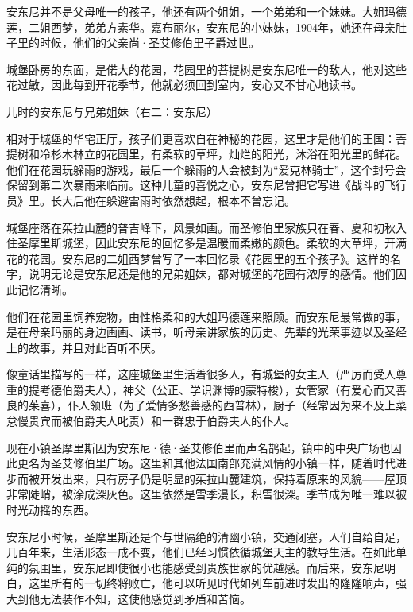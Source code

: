 安东尼并不是父母唯一的孩子，他还有两个姐姐，一个弟弟和一个妹妹。大姐玛德莲，二姐西梦，弟弟方素华。嘉布丽尔，安东尼的小妹妹，1904年，她还在母亲肚子里的时候，他们的父亲尚·圣艾修伯里子爵过世。

城堡卧房的东面，是偌大的花园，花园里的菩提树是安东尼唯一的敌人，他对这些花过敏，因此每到开花季节，他就必须回到室内，安心又不甘心地读书。

{\startalignment[center]
 \stopalignment}
儿时的安东尼与兄弟姐妹（右二：安东尼）

相对于城堡的华宅正厅，孩子们更喜欢自在神秘的花园，这里才是他们的王国：菩提树和冷杉木林立的花园里，有柔软的草坪，灿烂的阳光，沐浴在阳光里的鲜花。他们在花园玩躲雨的游戏，最后一个躲雨的人会被封为“爱克林骑士”，这个封号会保留到第二次暴雨来临前。这种儿童的喜悦之心，安东尼曾把它写进《战斗的飞行员》里。长大后他在躲避雷雨时依然想起，根本不曾忘记。

城堡座落在茱拉山麓的普吉峰下，风景如画。而圣修伯里家族只在春、夏和初秋入住圣摩里斯城堡，因此安东尼的回忆多是温暖而柔嫩的颜色。柔软的大草坪，开满花的花园。安东尼的二姐西梦曾写了一本回忆录《花园里的五个孩子》。这样的名字，说明无论是安东尼还是他的兄弟姐妹，都对城堡的花园有浓厚的感情。他们因此记忆清晰。

他们在花园里饲养宠物，由性格柔和的大姐玛德莲来照顾。而安东尼最常做的事，是在母亲玛丽的身边画画、读书，听母亲讲家族的历史、先辈的光荣事迹以及圣经上的故事，并且对此百听不厌。

像童话里描写的一样，这座城堡里生活着很多人，有城堡的女主人（严厉而受人尊重的提考德伯爵夫人），神父（公正、学识渊博的蒙特梭），女管家（有爱心而又善良的茱喜），仆人领班（为了爱情多愁善感的西普林），厨子（经常因为来不及上菜怠慢贵宾而被伯爵夫人叱责）和一群忠于伯爵夫人的仆人。

现在小镇圣摩里斯因为安东尼·德·圣艾修伯里而声名鹊起，镇中的中央广场也因此更名为圣艾修伯里广场。这里和其他法国南部充满风情的小镇一样，随着时代进步而被开发出来，只有房子仍是明显的茱拉山麓建筑，保持着原来的风貌------屋顶非常陡峭，被涂成深灰色。这里依然是雪季漫长，积雪很深。季节成为唯一难以被时光动摇的东西。

安东尼小时候，圣摩里斯还是个与世隔绝的清幽小镇，交通闭塞，人们自给自足，几百年来，生活形态一成不变，他们已经习惯依循城堡天主的教导生活。在如此单纯的氛围里，安东尼即使很小也能感受到贵族世家的优越感。而后来，安东尼明白，这里所有的一切终将败亡，他可以听见时代如列车前进时发出的隆隆响声，强大到他无法装作不知，这使他感觉到矛盾和苦恼。

